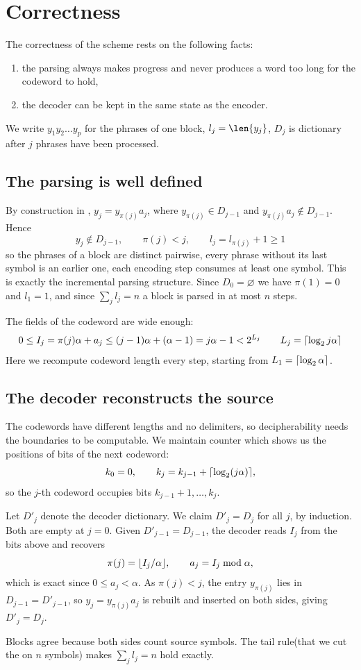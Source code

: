 \section{Correctness}
\label{fact:lz78correctness}

The correctness of the scheme rests on the following facts:
\begin{enumerate}
    \item the parsing always makes progress and never produces a word too long for the codeword to hold,
    \item the decoder can be kept in the same state as the encoder.
\end{enumerate}

We write \(y_1 y_2 \ldots y_p\) for the phrases of one block, \(l_j = \len{y_j}\), \(D_j\) is dictionary after \(j\) phrases have been processed.

\subsection{The parsing is well defined}

By construction in , \(y_j = y_{\pi(j)} a_j\), where \(y_{\pi(j)} \in D_{j-1}\) and \(y_{\pi(j)} a_j \notin D_{j-1}\). Hence
\[
    y_j \notin D_{j-1}, \qquad \pi(j) < j, \qquad l_j = l_{\pi(j)} + 1 \geq 1
\]
so the phrases of a block are distinct pairwise, every phrase without its last symbol is an earlier one, each encoding step consumes at least one symbol. This is exactly the incremental parsing structure. Since \(D_0 = \varnothing\) we have \(\pi(1) = 0\) and \(l_1 = 1\), and since \(\sum_j l_j = n\) a block is parsed in at most \(n\) steps.

The fields of the codeword are wide enough:
\[
    0 \leq I_j = \pi(j) \alpha + a_j \leq (j-1)\alpha + (\alpha - 1) = j\alpha - 1 < 2^{L_j}
    \qquad
    L_j = \left\lceil\log_2 j\alpha\right\rceil
\]
Here we recompute codeword length every step, starting from \(L_1 = \left\lceil\log_2 \alpha\right\rceil\).

\subsection{The decoder reconstructs the source}

The codewords have different lengths and no delimiters, so decipherability needs the boundaries to be computable. We maintain counter which shows us the positions of bits of the next codeword:
\[
    k_0 = 0, \qquad k_j = k_{j-1} + \ceil{\log_2 (j\alpha)} ,
\]
so the \(j\)-th codeword occupies bits \(k_{j-1}+1, \ldots, k_j\).

Let \(D'_j\) denote the decoder dictionary. We claim \(D'_j = D_j\) for all \(j\), by induction. Both are empty at \(j = 0\). Given \(D'_{j-1} = D_{j-1}\), the decoder reads \(I_j\) from the bits above and recovers
\[
    \pi(j) = \floor{I_j / \alpha}, \qquad a_j = I_j \bmod \alpha ,
\]
which is exact since \(0 \leq a_j < \alpha\). As \(\pi(j) < j\), the entry \(y_{\pi(j)}\) lies in \(D_{j-1} = D'_{j-1}\), so \(y_j = y_{\pi(j)} a_j\) is rebuilt and inserted on both sides, giving \(D'_j = D_j\).

Blocks agree because both sides count source symbols. The tail rule(that we cut the on \(n\) symbols) makes \(\sum_j l_j = n\) hold exactly.
